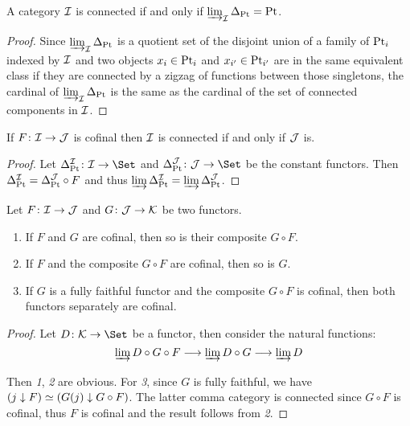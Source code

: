 \begin{lem}\label{lem:connected category}
  A category ${\cal I}$ is connected if and only if $\operatorname*{\underrightarrow{\lim}}_{{\cal I}}\Delta_{\operatorname{Pt}}=\operatorname{Pt}$.
\end{lem}
\begin{proof}
  Since $\operatorname*{\underrightarrow{\lim}}_{{\cal I}}\Delta_{\operatorname{Pt}}$ is a quotient set of the disjoint union of a family of $\operatorname{Pt}_i$ indexed by ${\cal I}$ and two objects $x_i\in\operatorname{Pt}_i$ and $x_{i'}\in\operatorname{Pt}_{i'}$ are in the same equivalent class if they are connected by a zigzag of functions between those singletons, the cardinal of $\operatorname*{\underrightarrow{\lim}}_{{\cal I}}\Delta_{\operatorname{Pt}}$ is the same as the cardinal of the set of connected components in ${\cal I}$.
\end{proof}

\begin{prop}
If $F\colon{\cal I}\to{\cal J}$ is cofinal then ${\cal I}$ is connected if and only if ${\cal J}$ is.
\end{prop}
\begin{proof}
  Let $\Delta^{\Ii}_{\Pt}\colon\Ii\to\Set$ and $\Delta^{\Jj}_{\Pt}\colon\Jj\to\Set$ be the constant functors. Then $\Delta^{{\cal I}}_{\operatorname{Pt}}=\Delta^{{\cal J}}_{\operatorname{Pt}}\circ F$ and thus $\operatorname*{\underrightarrow{\lim}}\Delta^{{\cal I}}_{\operatorname{Pt}}=\operatorname*{\underrightarrow{\lim}}\Delta^{{\cal J}}_{\operatorname{Pt}}$.
\end{proof}

\begin{prop}
Let $F\colon{\cal I}\to{\cal J}$ and $G\colon{\cal J}\to{\cal K}$ be two functors.
\begin{enumerate}
  \item If $F$ and $G$ are cofinal, then so is their composite $G \circ F$.
  \item If $F$ and the composite $G \circ F$ are cofinal, then so is $G$.
  \item If $G$ is a fully faithful functor and the composite $G \circ F$ is cofinal, then both functors separately are cofinal.
\end{enumerate}
\end{prop}
\begin{proof}
  Let $D\colon\Kk\to\Set$ be a functor, then consider the natural functions:
  \begin{equation*}
    \operatorname*{\underrightarrow{\lim}} D\circ G\circ F \longrightarrow \operatorname*{\underrightarrow{\lim}} D\circ G \longrightarrow \operatorname*{\underrightarrow{\lim}} D
  \end{equation*}

  Then \emph{1}, \emph{2} are obvious. For \emph{3}, since $G$ is fully faithful, we have $(j\downarrow F)\simeq(G(j)\downarrow G\circ F)$. The latter comma category is connected since $G \circ F$ is cofinal, thus $F$ is cofinal and the result follows from \emph{2}.
\end{proof}

